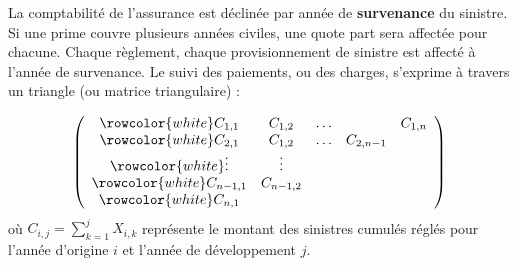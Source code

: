 \begin{f}
	
	La comptabilité de l'assurance est déclinée par année de \textbf{survenance} du sinistre. 
	Si une prime couvre plusieurs années civiles, une quote part sera affectée pour chacune.
	Chaque règlement, chaque provisionnement de sinistre est affecté à l'année de survenance. 
	Le suivi des paiements, ou des charges, s'exprime à travers  un triangle (ou matrice triangulaire) :
	
	\[
	\left(\begin{array}{ccccc}
		\rowcolor{white}	C_{1,1} & C_{1,2} & \ldots & & C_{1, n} \\
		\rowcolor{white}	C_{2,1} & C_{1,2} & \ldots & C_{2, n-1} \\
		\rowcolor{white}	\vdots & \vdots & & \\
		\rowcolor{white}	C_{n-1,1} & C_{n-1,2} & & \\
		\rowcolor{white}	C_{n, 1} & & &
	\end{array}\right)
	\]
	où \(C_{i, j}=\sum_{k=1}^{j} X_{i, k}\) représente le montant des sinistres cumulés  réglés pour l'année d'origine \(i\) et l'année de développement \(j\).
	
\end{f}


